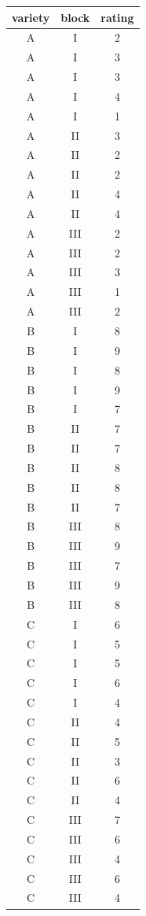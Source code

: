 \documentclass[
  letterpaper,
]{scrbook}
\begin{document}
\begin{longtable}[]{@{}ccc@{}}
\toprule()
variety & block & rating \\
\midrule()
\endhead
A & I & 2 \\
A & I & 3 \\
A & I & 3 \\
A & I & 4 \\
A & I & 1 \\
A & II & 3 \\
A & II & 2 \\
A & II & 2 \\
A & II & 4 \\
A & II & 4 \\
A & III & 2 \\
A & III & 2 \\
A & III & 3 \\
A & III & 1 \\
A & III & 2 \\
B & I & 8 \\
B & I & 9 \\
B & I & 8 \\
B & I & 9 \\
B & I & 7 \\
B & II & 7 \\
B & II & 7 \\
B & II & 8 \\
B & II & 8 \\
B & II & 7 \\
B & III & 8 \\
B & III & 9 \\
B & III & 7 \\
B & III & 9 \\
B & III & 8 \\
C & I & 6 \\
C & I & 5 \\
C & I & 5 \\
C & I & 6 \\
C & I & 4 \\
C & II & 4 \\
C & II & 5 \\
C & II & 3 \\
C & II & 6 \\
C & II & 4 \\
C & III & 7 \\
C & III & 6 \\
C & III & 4 \\
C & III & 6 \\
C & III & 4 \\

\end{longtable}
\end{document}
